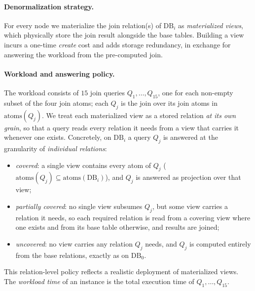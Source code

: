 \documentclass[sigconf]{acmart}
\begin{document}
\paragraph{Denormalization strategy.}
For every node we materialize the join relation(s) of $\mathrm{DB}_i$ as \emph{materialized views}, which physically store the join result alongside the base tables.
Building a view incurs a one-time \emph{create} cost and adds storage redundancy, in exchange for answering the workload from the pre-computed join.

\paragraph{Workload and answering policy.}
The workload consists of $15$ join queries $Q_1,\dots,Q_{15}$, one for each non-empty subset of the four join atoms; each $Q_j$ is the join over its join atoms in $\mathrm{atoms}(Q_j)$.
We treat each materialized view as a stored relation \emph{at its own grain}, so that a query reads every relation it needs from a view that carries it whenever one exists.
Concretely, on $\mathrm{DB}_i$ a query $Q_j$ is answered at the granularity of \emph{individual relations}:
\begin{itemize}[leftmargin=1.5em,itemsep=1pt,parsep=0pt,topsep=2pt]
  \item \emph{covered}: a single view contains every atom of $Q_j$
        ($\mathrm{atoms}(Q_j)\subseteq\mathrm{atoms}(\mathrm{DB}_i)$), and $Q_j$ is
        answered as projection over that view;
  \item \emph{partially covered}: no single view subsumes $Q_j$, but some view
        carries a relation it needs, so each required relation is read from a
        covering view where one exists and from its base table otherwise, and
        results are joined;
  \item \emph{uncovered}: no view carries any relation $Q_j$ needs, and $Q_j$ is
        computed entirely from the base relations, exactly as on $\mathrm{DB}_0$.
\end{itemize}
This relation-level policy reflects a realistic deployment of materialized views. The \emph{workload time} of an instance is the total execution time of $Q_1,\dots,Q_{15}$.
\end{document}
